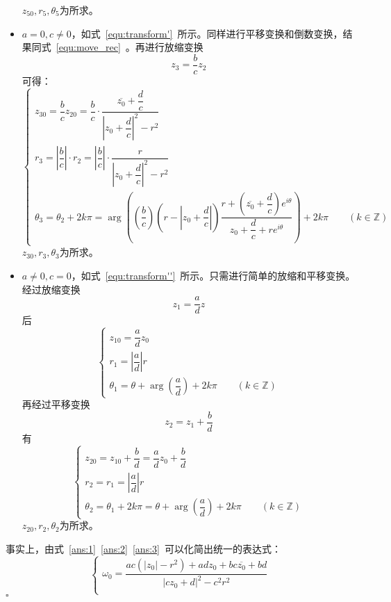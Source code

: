 \documentclass{article}
\newenvironment{SOLUTION}[1][{}]{{\noindent\heiti 解#1：}}{\hfill $\square$\par}
\begin{document}
\begin{SOLUTION}
\begin{itemize}
    $z_{50},r_5,\theta_5$为所求。

    \item $a=0,c\neq 0$，如式~\eqref{equ:transform'}~所示。同样进行平移变换和倒数变换，结果同式~\eqref{equ:move_rec}~。再进行放缩变换
    $$z_3=\dfrac{b}{c}z_2$$
    可得：
    \begin{equation}
        \begin{cases}
        z_{30}=\dfrac{b}{c}z_{20}=\dfrac{b}{c}\cdot\dfrac{\overline{z_0}+\dfrac{d}{c}}{\left|z_0+\dfrac{d}{c}\right|^2-r^2}\\[2ex]
        r_3=\left|\dfrac{b}{c}\right|\cdot r_2=\left|\dfrac{b}{c}\right|\cdot\dfrac{r}{\left|z_0+\dfrac{d}{c}\right|^2-r^2}\\[2ex]
        \theta_3=\theta_2+2k\pi=\arg \left(\left(\dfrac{b}{c}\right)\left(r-\left|z_0+\dfrac{d}{c}\right|\right)\dfrac{r+\left(\overline{z_0}+\dfrac{d}{c}\right)e^{i\theta}}{z_0+\dfrac{d}{c}+re^{i\theta}}\right)+2k\pi\qquad (k\in \mathbb{Z})
        \end{cases}
        \label{ans:2}
        \end{equation}   
    $z_{30},r_3,\theta_3$为所求。
    \item $a\neq 0 , c=0$，如式~\eqref{equ:transform''}~所示。只需进行简单的放缩和平移变换。经过放缩变换$$z_1=\dfrac{a}{d}z$$后
    \begin{equation}
        \begin{cases}
        z_{10}=\dfrac{a}{d}z_0\\[2ex]
        r_1=\left|\dfrac{a}{d}\right|r\\[2ex]
        \theta_1 = \theta+\arg\left(\dfrac{a}{d}\right)+2k\pi\qquad(k\in\mathbb{Z})
        \end{cases}
        \end{equation}
    再经过平移变换$$z_2=z_1+\dfrac{b}{d}$$有 
    \begin{equation}
        \begin{cases}
            z_{20} =z_{10}+\dfrac{b}{d}= \dfrac{a}{d}z_0+\dfrac{b}{d}\\[2ex]
            r_2=r_1=\left|\dfrac{a}{d}\right|r\\[2ex]
            \theta_2=\theta_1+2k\pi= \theta+\arg\left(\dfrac{a}{d}\right)+2k\pi\qquad(k\in\mathbb{Z})
        \end{cases}
        \label{ans:3}
    \end{equation}
    $z_{20},r_2,\theta_2$为所求。
\end{itemize}
    事实上，由式~\eqref{ans:1}~\eqref{ans:2}~\eqref{ans:3}~可以化简出统一的表达式：
    \begin{equation}
        \begin{cases}
            \omega_0=\dfrac{ac(|z_0|-r^2)+adz_0+bc\overline{z_0}+bd}{|cz_0+d|^2-c^2r^2}\\[2ex]
            

\end{cases}
\end{equation}
\end{SOLUTION}
\end{document}
